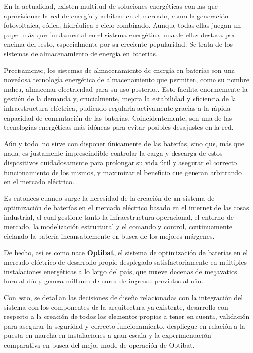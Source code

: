 En la actualidad, existen multitud de soluciones energéticas con las que aprovisionar la red de energía y arbitrar en el mercado, como la generación fotovoltaica, eólica, hidráulica o ciclo combinado. Aunque todas ellas juegan un papel más que fundamental en el sistema energético, una de ellas destaca por encima del resto, especialmente por su creciente popularidad. Se trata de los sistemas de almacenamiento de energía en baterías.

Precisamente, los sistemas de almacenamiento de energía en baterías son una novedosa tecnología energética de almacenamiento que permiten, como su nombre indica, almacenar electricidad para su uso posterior. Esto facilita enormemente la gestión de la demanda y, crucialmente, mejora la estabilidad y eficiencia de la infraestructura eléctrica, pudiendo regularla activamente gracias a la rápida capacidad de conmutación de las baterías. Coincidentemente, son una de las tecnologías energéticas más idóneas para evitar posibles desajustes en la red.

Aún y todo, no sirve con disponer únicamente de las baterías, sino que, más que nada, es justamente imprescindible controlar la carga y descarga de estos dispositivos cuidadosamente para prolongar su vida útil y asegurar el correcto funcionamiento de los mismos, y maximizar el beneficio que generan arbitrando en el mercado eléctrico.

Es entonces cuando surge la necesidad de la creación de un sistema de optimización de baterías en el mercado eléctrico basado en el internet de las cosas industrial, el cual gestione tanto la infraestructura operacional, el entorno de mercado, la modelización estructural y el comando y control, continuamente ciclando la batería incansablemente en busca de los mejores márgenes.

De hecho, así es como nace \textbf{Optibat}, el sistema de optimización de baterías en el mercado eléctrico de desarrollo propio desplegado satisfactoriamente en múltiples instalaciones energéticas a lo largo del país, que mueve docenas de megavatios hora al día y genera millones de euros de ingresos previstos al año.

Con esto, se detallan las decisiones de diseño relacionadas con la integración del sistema con los componentes de la arquitectura ya existente, desarrollo con respecto a la creación de todos los elementos propios a tener en cuenta, validación para asegurar la seguridad y correcto funcionamiento, despliegue en relación a la puesta en marcha en instalaciones a gran escala y la experimentación comparativa en busca del mejor modo de operación de Optibat.

